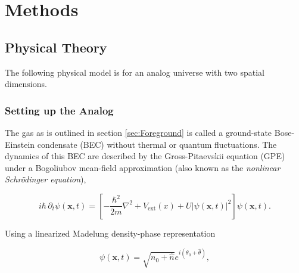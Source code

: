 \documentclass{article}
\begin{document}
    \section{Methods}

        \subsection{Physical Theory}

            The following physical model is for an analog universe with two spatial dimensions.

            \subsubsection{Setting up the Analog}

                The gas as is outlined in section \ref{sec:Foreground} is called a ground-state Bose-Einstein condensate (BEC) without thermal or quantum fluctuations.  \pagebreak The dynamics of this BEC are described by the Gross-Pitaevskii equation (GPE) under a Bogoliubov mean-field approximation (also known as the \textit{nonlinear Schr{\"o}dinger equation}),
                
                \begin{equation} \label{eq:GPE}
                    i \hbar \, \partial_t \psi(\mathbf{x}, t) = \left[ -\frac{\hbar^2}{2 m} \nabla^2 + V_\text{ext}(x) + U \left| \psi(\mathbf{x}, t) \right|^2 \right] \psi(\mathbf{x}, t).
                \end{equation}
                
                Using a linearized Madelung density-phase representation
    
                \begin{equation} \label{eq:Madelung}
                    \psi(\mathbf{x}, t) = \sqrt{n_0 + \hat{n}} e^{i \left( \theta_0 + \hat{\theta} \right)},
                \end{equation}
    
\end{document}
